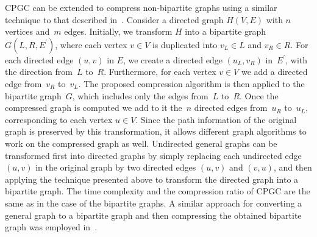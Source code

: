 \textsf{CPGC} can be extended to compress non-bipartite graphs using a similar technique to that described in~\cite{federMotwani}. Consider a directed graph $H(V, E)$ with $n$ vertices and~$m$ edges. Initially, we transform $H$ into a bipartite graph $G\left(L, R, E^{\prime}\right)$, where each vertex $v \in V$ is duplicated into $v_L \in L$ and $v_R \in R$. For each directed edge $(u, v)$ in $E$, we create a directed edge $\left(u_L, v_R\right)$ in~$E^{\prime}$, with the direction from~$L$ to~$R$. Furthermore, for each vertex $v \in V$ we add a directed edge from~$v_R$ to~$v_L$. The proposed compression algorithm is then applied to the bipartite graph~$G$, which includes only the edges from~$L$ to~$R$. Once the compressed graph is computed we add to it the~$n$ directed edges from~$u_R$ to~$u_L$, corresponding to each vertex $u\in V$. Since the path information of the original graph is preserved by this transformation, it allows different graph algorithms to work on the compressed graph as well. Undirected general graphs can be transformed first into directed graphs by simply replacing each undirected edge $(u,v)$ in the original graph by two directed edges $(u,v)$ and $(v,u)$, and then applying the technique presented above to transform the directed graph into a bipartite graph. 
The time complexity and the compression ratio of \textsf{CPGC} are the same as in the case of the bipartite graphs. A similar approach for converting a general graph to a bipartite graph and then compressing the obtained bipartite graph was employed in~\cite{scalable_compression, compressing_bisection}. 




